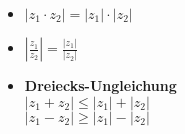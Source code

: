 \begin{multicols}{2}
    \begin{itemize}
        \item $|z_1 \cdot z_2| = |z_1| \cdot |z_2|$
        \item $|\frac{z_1}{z_2}| = \frac{|z_1|}{|z_2|}$
        \item \textbf{Dreiecks-Ungleichung}\\
        $|z_1 + z_2| \leq |z_1| + |z_2|$\\
        $|z_1 - z_2| \ge |z_1| - |z_2|$
    \end{itemize}
\end{multicols}